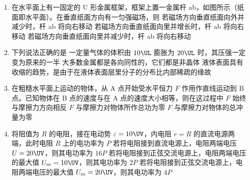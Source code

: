 \documentclass[\gkver]{gaokaozhenti}
\begin{document}
\begin{enumerate}

\item
在水平面上有一固定的 U 形金属框架，框架上置一金属杆 ab，如图所示（纸面即水平面）。在垂直纸面方向有一匀强磁场，则
\onepicture[w=3.20cm]{}
{若磁场方向垂直纸面向外并减少时，杆 ab 将向右移动}
{若磁场方向垂直纸面向里并增长时，杆 ab 将向右移动}
{若磁场方向垂直纸面向里并减少时，杆 ab 将向右移动}


\item
下列说法正确的是
{一定量气体的体积由 $10\UL$ 膨胀为 $20\UL$ 时，其压强一定变为原来的一半}
{大多数金属都是各向同性的，它们都是非晶体}
{液体表面具有收缩的趋势，是由于在液体表面层里分子的分布比内部稀疏的缘故}


\item
在粗糙水平面上运动的物体，从 A 点开始受水平恒力 $F$ 作用作直线运动到 B 点。已知物体在 B 点的速度与在 A 点的速度大小相等，则在这过程中
{$F$ 始终与摩擦力方向相反}
{$F$ 与摩擦力对物体所作总功为零}
{$F$ 与摩擦力对物体的总冲量为零}


\item
将阻值为 $R$ 的电阻，接在电动势 $\varepsilon = 10\UV$，内电阻 $r = R$ 的直流电源两端，此时电阻 $R$ 上的电功率为 $P$
{若将电阻接到直流电源上，电阻两端电压 $U = 20\UV$，则其电功率为 $16P$}
{若将电阻接到正弦交流电源上，电阻两端电压的最大值 $U_{m} = 10\UV$，则其电功率为 $2P$}
{若将电阻接到正弦交流电源上，电阻两端电压的最大值 $U_{m} = 20\UV$，则其电功率为 $4P$}


\end{enumerate}
\end{document}
